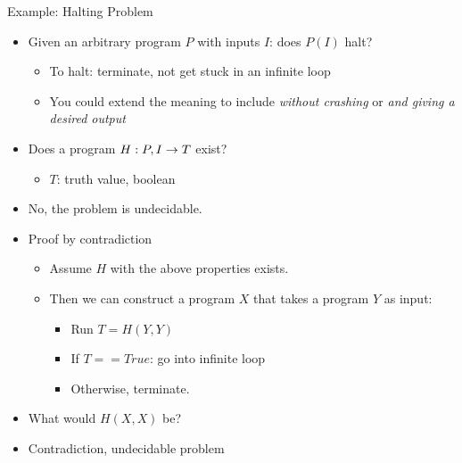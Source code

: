 \begin{frame}{Example: Halting Problem}
%
\begin{itemize}
\item Given an arbitrary program $P$ with inputs $I$: does $P(I)$ halt?
	\begin{itemize}
	\item To halt: terminate, \ie not get stuck in an infinite loop
	\item You could extend the meaning to include \emph{without crashing} or \emph{and giving a desired output}
	\end{itemize}
\item Does a program $H: P, I \rightarrow T$ exist?
	\begin{itemize}
	\item $T$: truth value, \ie boolean
	\end{itemize}
\pause
\item No, the problem is undecidable.
\item Proof by contradiction
	\begin{itemize}
	\item Assume $H$ with the above properties exists.
	\item Then we can construct a program $X$ that takes a program $Y$ as input:
		\begin{itemize}
		\item Run $T = H(Y, Y)$
		\item If $T == True$: go into infinite loop
		\item Otherwise, terminate.
		\end{itemize}
	\end{itemize}
\item[\Thus] What would $H(X, X)$ be?
\item[\Thus] Contradiction, undecidable problem
\end{itemize}
%
\end{frame}


